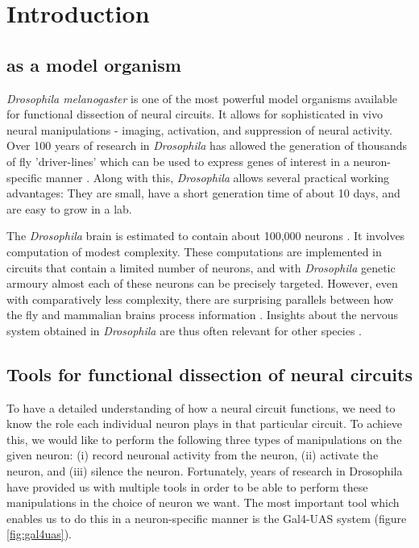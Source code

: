 \chapter{Introduction}
\label{chp:Introduction}


\section{\protect{} as a model organism}
\textit{Drosophila melanogaster} is one of the most powerful model organisms available for functional dissection of neural circuits. It allows for sophisticated in vivo neural manipulations - imaging, activation, and suppression of neural activity. Over 100 years of research in \textit{Drosophila} has allowed the generation of thousands of fly 'driver-lines' which can be used to express genes of interest in a neuron-specific manner \parencite{Pfeiffer2008}. Along with this, \textit{Drosophila} allows several practical working advantages: They are small, have a short generation time of about 10 days, and are easy to grow in a lab. 

The \textit{Drosophila} brain is estimated to contain about 100,000 neurons \parencite{Zheng2018}. It involves computation of modest complexity. These computations are implemented in circuits that contain a limited number of neurons, and with \textit{Drosophila} genetic armoury almost each of these neurons can be precisely targeted. However, even with comparatively less complexity, there are surprising parallels between how the fly and mammalian brains process information \parencite{Borst2015}. Insights about the nervous system obtained in \textit{Drosophila} are thus often relevant for other species \parencite{Bellen2010, Venken2011}.

\section{Tools for functional dissection of \protect{} neural circuits}
To have a detailed understanding of how a neural circuit functions, we need to know the role each individual neuron plays in that particular circuit. To achieve this, we would like to perform the following three types of manipulations on the given neuron: (i) record neuronal activity from the neuron, (ii) activate the neuron, and (iii) silence the neuron. Fortunately, years of research in Drosophila have provided us with multiple tools in order to be able to perform these manipulations in the choice of neuron we want. The most important tool which enables us to do this in a neuron-specific manner is the Gal4-UAS system (figure  \ref{fig:gal4uas}). 

